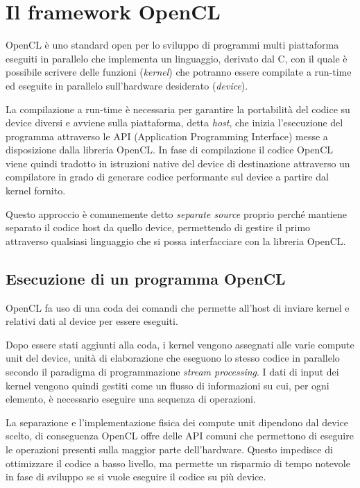 \chapter{Il framework OpenCL}\label{capitolo2opencl}
\vspace{4cm}
OpenCL\cite{opencl} è uno standard open per lo sviluppo di programmi multi piattaforma eseguiti in parallelo che implementa un linguaggio, derivato dal C, con il quale è possibile scrivere delle funzioni (\textit{kernel}) che potranno essere compilate a run-time ed eseguite in parallelo sull'hardware desiderato (\textit{device}).

La compilazione a run-time è necessaria per garantire la portabilità del codice su device diversi e avviene sulla piattaforma, detta \textit{host}, che inizia l'esecuzione del programma attraverso le API (Application Programming Interface) messe a disposizione dalla libreria OpenCL.
In fase di compilazione il codice OpenCL viene quindi tradotto in istruzioni native del device di destinazione attraverso un compilatore in grado di generare codice performante sul device a partire dal kernel fornito.

Questo approccio è comunemente detto \textit{separate source} proprio perché mantiene separato il codice host da quello device, permettendo di gestire il primo attraverso qualsiasi linguaggio che si possa interfacciare con la libreria OpenCL.

\section{Esecuzione di un programma OpenCL}
OpenCL fa uso di una coda dei comandi che permette all'host di inviare kernel e relativi dati al device per essere eseguiti.

Dopo essere stati aggiunti alla coda, i kernel vengono assegnati alle varie compute unit del device, unità di elaborazione che eseguono lo stesso codice in parallelo secondo il paradigma di programmazione \textit{stream processing}. I dati di input dei kernel vengono quindi gestiti come un flusso di informazioni su cui, per ogni elemento, è necessario eseguire una sequenza di operazioni.
 
La separazione e l'implementazione fisica dei compute unit dipendono dal device scelto, di conseguenza OpenCL offre delle API comuni che permettono di eseguire le operazioni presenti sulla maggior parte dell'hardware. Questo impedisce di ottimizzare il codice a basso livello, ma permette un risparmio di tempo notevole in fase di sviluppo se si vuole eseguire il codice su più device.

